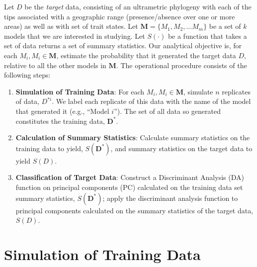\documentclass[11pt,openany]{memoir} %
\newcommand{\targetData}{D}
\newcommand{\trainingDataForModel}[1]{D^{*#1}}
\newcommand{\trainingDataSet}{\mathbf{D}^{*}}
\newcommand{\summaryStatisticFunction}{S}
\newcommand{\modelCategory}[1]{M_{#1}}
\newcommand{\modelCategories}{\mathbf{M}}
\begin{document}
Let $\targetData$ be the \textit{target} data, consisting of an ultrametric phylogeny with each of the tips associated with a geographic range (presence/absence over one or more areas) as well as with set of trait states.
Let $\modelCategories = \{\modelCategory{1}, \modelCategory{2}, ... \modelCategory{m}\}$ be a set of $k$ models that we are interested in studying.
Let $\summaryStatisticFunction(\cdot)$ be a function that takes a set of data returns a set of summary statistics.
Our analytical objective is, for each $\modelCategory{i}, \modelCategory{i} \in \modelCategories$, estimate the probability that it generated the target data $\targetData$, relative to all the other models in $\modelCategories$.
The operational procedure consists of the following steps:
\begin{enumerate}
    \item \textbf{Simulation of Training Data}: For each $\modelCategory{i}, \modelCategory{i} \in \modelCategories$, simulate $n$ replicates of data, $\trainingDataForModel{i}$. We label each replicate of this data with the name of the model that generated it (e.g., ``Model $i$''). The set of all data so generated constitutes the training data, $\trainingDataSet$.
    \item \textbf{Calculation of Summary Statistics}: Calculate summary statistics on the training data to yield, $\summaryStatisticFunction(\trainingDataSet)$, and summary statistics on the target data to yield $\summaryStatisticFunction(\targetData)$.
    \item \textbf{Classification of Target Data}: Construct a Discriminant Analysis (DA) function on principal components (PC) calculated on the training data set summary statistics, $\summaryStatisticFunction(\trainingDataSet)$; apply the discriminant analysis function to principal components calculated on the summary statistics of the target data, $\summaryStatisticFunction(\targetData)$.
\end{enumerate}

\section{Simulation of Training Data}
\end{document}

